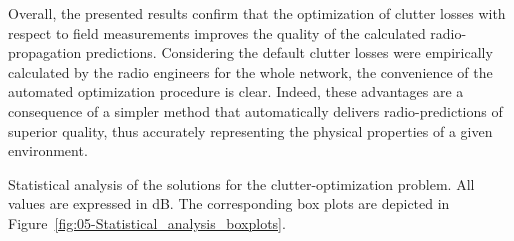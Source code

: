 Overall, the presented results confirm that the optimization of clutter
losses with respect to field measurements improves the quality of
the calculated radio-propagation predictions. Considering the default
clutter losses were empirically calculated by the radio engineers
for the whole network, the convenience of the automated optimization
procedure is clear. Indeed, these advantages are a consequence of
a simpler method that automatically delivers radio-predictions of
superior quality, thus accurately representing the physical properties
of a given environment.

\begin{table}
\centering

\caption{Statistical analysis of the solutions for the clutter-optimization
problem. All values are expressed in dB. The corresponding box plots
are depicted in Figure~\ref{fig:05-Statistical_analysis_boxplots}.
\label{tab:05-Statistical_analysis_of_solutions}}



\end{table}
